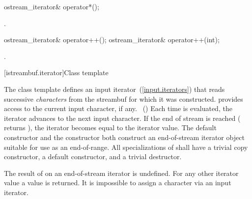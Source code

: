 %
%
\begin{itemdecl}
ostream_iterator& operator*();
\end{itemdecl}

\begin{itemdescr}
\pnum
\returns
{}.
\end{itemdescr}

%
%
\begin{itemdecl}
ostream_iterator& operator++();
ostream_iterator& operator++(int);
\end{itemdecl}

\begin{itemdescr}
\pnum
\returns
{}.
\end{itemdescr}

[istreambuf.iterator]{Class template }

\pnum
The
class template
defines an input iterator~(\ref{input.iterators}) that
reads successive
\textit{characters}
from the streambuf for which it was constructed.
provides access to the current input character, if any.
~()
Each time
is evaluated, the iterator advances to the next input character.
If the end of stream is reached ( returns
),
the iterator becomes equal to the
iterator value.
The default constructor
and the constructor
both construct an end-of-stream iterator object suitable for use
as an end-of-range.
All specializations of  shall have a trivial copy
constructor, a  default constructor, and a trivial destructor.

\pnum
The result of
on an end-of-stream iterator is undefined.
%
For any other iterator value a
value is returned.
It is impossible to assign a character via an input iterator.

